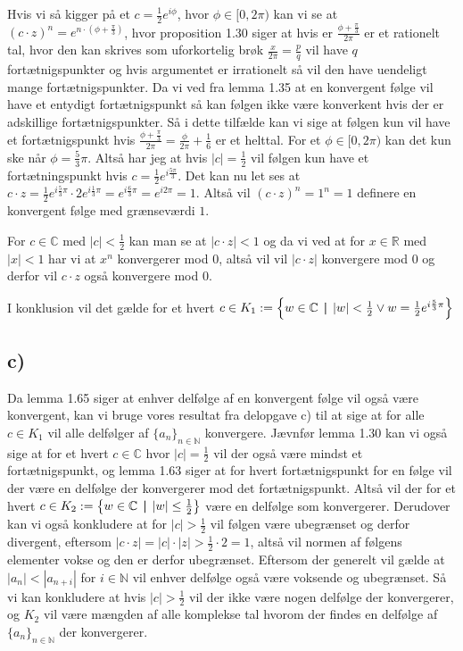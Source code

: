 \documentclass{article}
\newcommand{\m}[1]{\mathbb{#1}}
\newcommand{\mC}{\m{C}}
\newcommand{\mR}{\m{R}}
\newcommand{\mN}{\m{N}}
\newcommand{\set}[2]{\left\{ #1 \hspace{0.15cm} \textbf{\textbar}  \hspace{0.15cm} #2 \right\} }
\begin{document}
Hvis vi så kigger på et $c = \frac{1}{2} e^{i\phi}$, hvor $\phi \in [ 0,2\pi )$ kan vi se at $(c \cdot z)^n = e^{n\cdot (\phi + \frac{\pi}{3})}$, hvor proposition 1.30 siger at
hvis er $ \frac{\phi + \frac{\pi}{3}}{2\pi}$ er et rationelt tal, hvor den kan skrives som uforkortelig brøk
$\frac{x}{2\pi} = \frac{p}{q}$ vil have $q$ fortætnigspunkter og hvis argumentet er irrationelt så vil den have uendeligt mange fortætnigspunkter.
Da vi ved fra lemma 1.35 at en konvergent følge vil have et entydigt fortætnigspunkt så kan følgen ikke være konverkent hvis der er
adskillige fortætnigspunkter. Så i dette tilfælde kan vi sige at følgen kun vil have et fortætnigspunkt hvis
$\frac{\phi + \frac{\pi}{3}}{2\pi} = \frac{\phi}{2\pi} + \frac{1}{6}$ er et helttal. For et $\phi \in [0, 2\pi)$ kan det kun ske når 
$\phi = \frac{5}{3}\pi$. Altså har jeg at hvis $|c| = \frac{1}{2}$ vil følgen kun have et fortætningspunkt hvis $c = \frac{1}{2}e^{i\frac{5\pi}{3}}$.
Det kan nu let ses at $c \cdot z = \frac{1}{2}e^{i\frac{5}{3}\pi} \cdot 2 e^{i \frac{1}{3}\pi} = e^{i \frac{6}{3}\pi} = e^{i2\pi} = 1$.
Altså vil $(c \cdot z)^n = 1^n = 1$ definere en konvergent følge med grænseværdi $1$.

For $c \in \mC$ med $|c| < \frac{1}{2}$ kan man se at
$|c\cdot z| < 1$ og da vi ved at for $x \in \mR$ med $|x| < 1$ har vi at $x^n$ konvergerer mod $0$, altså vil
vil $|c \cdot z|$ konvergere mod $0$ og derfor vil $c \cdot z$ også konvergere mod $0$.

I konklusion vil det gælde for et hvert $ c \in K_1 := \set{w \in \mC}{|w| < \frac{1}{2} \lor w = \frac{1}{2}e^{i\frac{5}{3}\pi}}$

\subsection*{c)}
Da lemma 1.65 siger at enhver delfølge af en konvergent følge vil også være konvergent,
kan vi bruge vores resultat fra delopgave c) til at sige at for alle $c \in K_1$
vil alle delfølger af $\{ a_n \}_{n \in \mN}$ konvergere. Jævnfør lemma 1.30 kan 
vi også sige at for et hvert $c \in \mC$ hvor $|c| = \frac{1}{2}$ vil der også være mindst
et fortætnigspunkt, og lemma 1.63 siger at for hvert fortætnigspunkt for en følge
vil der være en delfølge der konvergerer mod det fortætnigspunkt. Altså vil 
der for et hvert $c \in K_2 := \set{w \in \mC}{|w| \le \frac{1}{2}}$ være en delfølge som konvergerer. 
Derudover kan vi også konkludere at for $|c| > \frac{1}{2}$ vil følgen være ubegrænset og derfor divergent, eftersom
$|c \cdot z| = |c| \cdot |z| > \frac{1}{2} \cdot 2 = 1$, altså vil normen af følgens elementer vokse og den er derfor ubegrænset.
Eftersom der generelt vil gælde at $|a_n| < |a_{n+i}|$ for $i \in \mN$ vil enhver delfølge også være voksende og ubegrænset.
Så vi kan konkludere at hvis $|c| > \frac{1}{2}$ vil der ikke være nogen delfølge der konvergerer, og $K_2$ vil være mængden af alle komplekse tal
hvorom der findes en delfølge af $\{ a_n \}_{n \in \mN}$ der konvergerer.
\end{document}
